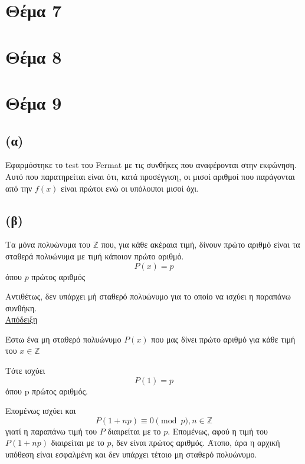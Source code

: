 \documentclass[a4paper, 11pt]{article}
\newcommand{\lt}{\latintext}
\begin{document}
\section*{Θέμα 7}

\section*{Θέμα 8}

\newpage


\section*{Θέμα 9}
\subsection*{(α)} Εφαρμόστηκε το test του {\lt Fermat} με τις συνθήκες που αναφέρονται στην εκφώνηση. Αυτό που παρατηρείται είναι ότι, κατά προσέγγιση, οι μισοί αριθμοί που παράγονται από την $f(x)$ είναι πρώτοι ενώ οι υπόλοιποι μισοί όχι.
\subsection*{(β)} Τα μόνα πολυώνυμα του $\mathbb{Z}$ που, για κάθε ακέραια τιμή, δίνουν πρώτο αριθμό είναι τα σταθερά πολυώνυμα με τιμή κάποιον πρώτο αριθμό.
\[P(x) = p\] όπου $p$ πρώτος αριθμός

Αντιθέτως, δεν υπάρχει μή σταθερό πολυώνυμο για το οποίο να ισχύει η παραπάνω συνθήκη.\\

\underline{Απόδειξη}

Έστω ένα μη σταθερό πολυώνυμο $P(x)$ που μας δίνει πρώτο αριθμό για κάθε τιμή του $x \in \mathbb{Z}$

Τότε ισχύει
\[P(1) = p\]
όπου p πρώτος αριθμός.

Επομένως ισχύει και
\[P(1 + np) \equiv 0 \pmod{p}, n \in \mathbb{Z} \]
γιατί η παραπάνω τιμή του $P$ διαιρείται με το $p$. Επομένως, αφού η τιμή του $P(1+np)$ διαιρείται με το $p$, δεν είναι πρώτος αριθμός. Άτοπο, άρα η αρχική υπόθεση είναι εσφαλμένη και δεν υπάρχει τέτοιο μη σταθερό πολυώνυμο.
\end{document}
